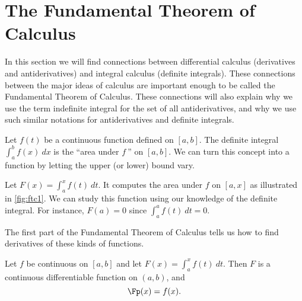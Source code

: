 \section{The Fundamental Theorem of Calculus}\label{sec:FTC}

In this section we will find connections between differential calculus (derivatives and antiderivatives) and integral calculus (definite integrals). These connections between the major ideas of calculus are important enough to be called the Fundamental Theorem of Calculus. These connections will also explain why we use the term indefinite integral for the set of all antiderivatives, and why we use such similar notations for antiderivatives and definite integrals.

Let $f(t)$ be a continuous function defined on $[a,b]$. The definite integral $\int_a^b f(x)\ dx$ is the ``area under $f\ $'' on $[a,b]$. We can turn this concept into a function by letting the upper (or lower) bound vary.

Let $F(x) = \int_a^x f(t)\ dt$. It computes the area under $f$ on $[a,x]$ as illustrated in \autoref{fig:ftc1}. We can study this function using our knowledge of the definite integral. For instance, $F(a)=0$ since $\int_a^af(t)\ dt=0$. %


The first part of the Fundamental Theorem of Calculus tells us how to find derivatives of these kinds of functions.

{Let $f$ be continuous on $[a,b]$ and let $F(x) = \int_a^x f(t)\ dt$. Then $F$ is a continuous differentiable function on $(a,b)$, and
\[\Fp(x)=f(x).\]}

